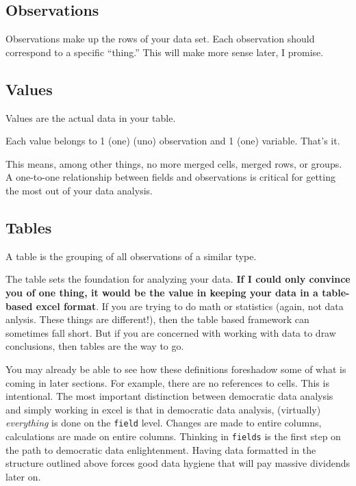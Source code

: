 \documentclass[]{book}
\begin{document}
\hypertarget{observations}{%
\subsection{Observations}\label{observations}}

Observations make up the rows of your data set. Each observation should correspond to a specific ``thing.'' This will make more sense later, I promise.

\hypertarget{values}{%
\subsection{Values}\label{values}}

Values are the actual data in your table.

Each value belongs to 1 (one) (uno) observation and 1 (one) variable. That's it.

This means, among other things, no more merged cells, merged rows, or groups. A one-to-one relationship between fields and observations is critical for getting the most out of your data analysis.

\hypertarget{tables}{%
\subsection{Tables}\label{tables}}

A table is the grouping of all observations of a similar type.

The table sets the foundation for analyzing your data. \textbf{If I could only convince you of one thing, it would be the value in keeping your data in a table-based excel format}. If you are trying to do math or statistics (again, not data anlysis. These things are different!), then the table based framework can sometimes fall short. But if you are concerned with working with data to draw conclusions, then tables are the way to go.

You may already be able to see how these definitions foreshadow some of what is coming in later sections. For example, there are no references to cells. This is intentional. The most important distinction between democratic data analysis and simply working in excel is that in democratic data analysis, (virtually) \emph{everything} is done on the \texttt{field} level. Changes are made to entire columns, calculations are made on entire columns. Thinking in \texttt{fields} is the first step on the path to democratic data enlightenment. Having data formatted in the structure outlined above forces good data hygiene that will pay massive dividends later on.
\end{document}
